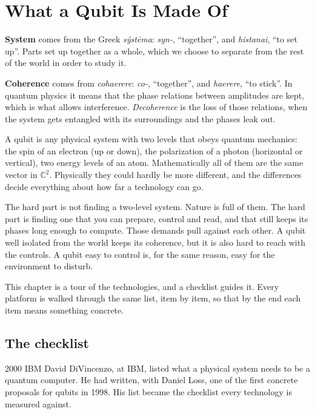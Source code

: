 \chapter{What a Qubit Is Made Of}\label{ch:hardware}

\begin{etymology}
\textbf{System} comes from the Greek \emph{sýstēma}: \emph{syn-}, ``together'',
and \emph{histanai}, ``to set up''. Parts set up together as a whole, which we
choose to separate from the rest of the world in order to study it.

\textbf{Coherence} comes from \emph{cohaerere}: \emph{co-}, ``together'', and
\emph{haerere}, ``to stick''. In quantum physics it means that the phase
relations between amplitudes are kept, which is what allows interference.
\emph{Decoherence} is the loss of those relations, when the system gets entangled
with its surroundings and the phases leak out.
\end{etymology}

A qubit is any physical system with two levels that obeys quantum mechanics: the
spin of an electron (up or down), the polarization of a photon (horizontal or
vertical), two energy levels of an atom. Mathematically all of them are the same
vector in $\mathbb{C}^2$. Physically they could hardly be more different, and the
differences decide everything about how far a technology can go.

The hard part is not finding a two-level system. Nature is full of them. The hard
part is finding one that you can prepare, control and read, and that still keeps
its phases long enough to compute. Those demands pull against each other. A qubit
well isolated from the world keeps its coherence, but it is also hard to reach
with the controls. A qubit easy to control is, for the same reason, easy for the
environment to disturb.

This chapter is a tour of the technologies, and a checklist guides it. Every
platform is walked through the same list, item by item, so that by the end each
item means something concrete.

\section{The checklist}

\begin{history}{2000 \textperiodcentered{} IBM}
David DiVincenzo, at IBM, listed what a physical system needs to be a quantum
computer. He had written, with Daniel Loss, one of the first concrete proposals for
qubits in 1998. His list became the checklist every technology is measured against.
\end{history}

